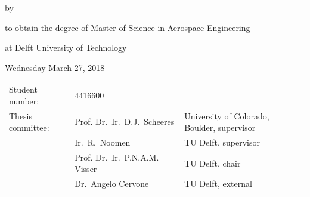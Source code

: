 \begin{titlepage}


\begin{center}


{\makeatletter
\titlestyle
\color{tudelft-cyan}
\fontsize{34}{30}
\selectfont{Orbital motion of regolith around asteroids \par}
\makeatother}

\bigskip
\bigskip
{\makeatletter
\ifx\@subtitle\undefined\else
    \bigskip
   {\tudsffamily\fontsize{16}{32}\selectfont\@subtitle}
\fi
\makeatother}

\bigskip
\bigskip

by

\bigskip
\bigskip

{\makeatletter
\titlestyle\fontsize{26}{26}\selectfont\@author
\makeatother}

\bigskip
\bigskip

to obtain the degree of Master of Science in Aerospace Engineering

at Delft University of Technology

\bigskip\bigskip
Wednesday March 27, 2018

\vfill

\begin{tabular}{lll}
    Student number: & 4416600 \\
    Thesis committee: & Prof. Dr.\ Ir.\ D.J.\ Scheeres & University of Colorado, Boulder, supervisor \\
        & Ir.\ R.\ Noomen & TU Delft, supervisor \\
        & Prof. Dr.\ Ir.\ P.N.A.M. Visser\ & TU Delft, chair \\
        & Dr.\ Angelo Cervone\ & TU Delft, external
\end{tabular}


\end{center}
\end{titlepage}
